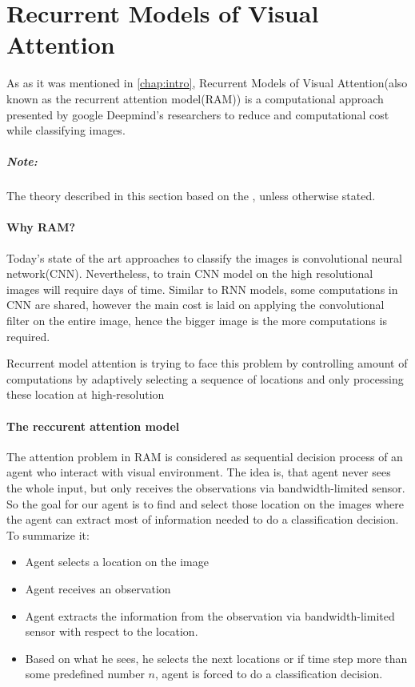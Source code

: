 \section{Recurrent Models of Visual Attention}

As as it was mentioned in \autoref{chap:intro}, Recurrent Models of Visual
Attention(also known as the recurrent attention model(RAM)) is
a computational approach presented by google Deepmind’s researchers to reduce
and computational cost while classifying images.
\subparagraph{Note: } The theory described in this section based on the
\cite{Ba2015}, unless otherwise stated.

\paragraph{Why RAM?}
Today's state of the art approaches to classify the images is convolutional
neural network(CNN). Nevertheless, to train CNN model on the high resolutional
images will require days of time. Similar to RNN models, some computations
in CNN are shared, however the main cost is laid on applying the convolutional
filter on the entire image, hence the bigger image is the
more computations is required.\cite{Krizhevsky2012}

Recurrent model attention is trying to face this problem by
controlling amount of computations by adaptively selecting a sequence of
locations and only processing these location at high-resolution


\paragraph{The reccurent attention model}
The attention problem in RAM is considered as sequential decision
process of an agent who interact with visual environment. The idea is,
that agent never sees the whole input, but only receives the observations
via bandwidth-limited sensor. So the goal for our agent is
to find and select those location on the images where the agent can extract
most of information needed to do a classification decision.
To summarize it:
\begin{itemize}
	\item Agent selects a location on the image
	\item Agent receives an observation
	\item Agent extracts the information from the observation via bandwidth-limited
		sensor with respect to the location.
	\item Based on what he sees, he selects the next locations or if time step
		more than some predefined number $n$, agent is forced to do a
		classification decision.
\end{itemize}

